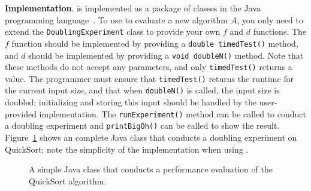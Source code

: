 
    {\bf Implementation}.  \toolname is implemented as a package of
    classes in the Java programming language~\cite{tool}.  To use
    \toolname to evaluate a new algorithm $A$, you only need to extend
    the \texttt{DoublingExperiment} class to provide your own $f$ and
    $d$ functions.  The $f$ function should be implemented by providing
    a \texttt{double timedTest()} method, and $d$ should be implemented
    by providing a \texttt{void doubleN()} method. Note that these
    methods do not accept any parameters, and only \texttt{timedTest()}
    returns a value. The programmer must ensure that
    \texttt{timedTest()} returns the runtime for the current input size,
    and that when \texttt{doubleN()} is called, the input size is
    doubled; initializing and storing this input should be handled by
    the user-provided implementation. The \texttt{runExperiment()}
    method can be called to conduct a doubling experiment and
    \texttt{printBigOh()} can be called to show the result.
    Figure~\ref{fig:qsprogram} shows an complete Java class that
    conducts a doubling experiment on QuickSort; note the simplicity of
    the implementation when using \toolname.



    \begin{figure}[t]
    
    \vspace{-0.15in}
    \caption{A simple Java class that conducts a performance evaluation
    of the QuickSort algorithm.}\vspace{-0.20in}
    \label{fig:qsprogram}
    \end{figure}
